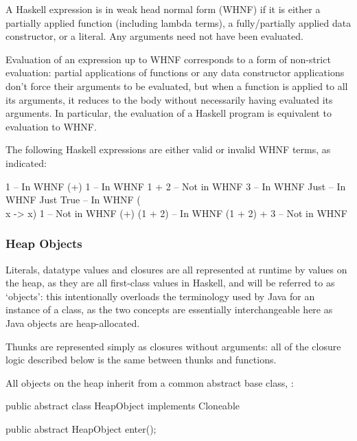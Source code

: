 \documentclass[dissertation.tex]{subfiles}
\begin{document}
{{{            A Haskell expression is in weak head normal form (WHNF) if it is either a partially applied function
            (including lambda terms), a fully/partially applied data constructor, or a literal. Any arguments need not
            have been evaluated.
            
            Evaluation of an expression up to WHNF corresponds to a form of non-strict evaluation: partial applications
            of functions or any data constructor applications don't force their arguments to be evaluated, but when a
            function is applied to all its arguments, it reduces to the body without necessarily having evaluated its
            arguments. In particular, the evaluation of a Haskell program is equivalent to evaluation to WHNF.

            The following Haskell expressions are either valid or invalid WHNF terms, as indicated:

            \begin{haskellfigure}
            1               -- In WHNF
            (+) 1           -- In WHNF
            1 + 2           -- Not in WHNF
            3               -- In WHNF
            Just            -- In WHNF
            Just True       -- In WHNF
            (\\x -> x) 1    -- Not in WHNF
            (+) (1 + 2)     -- In WHNF
            (1 + 2) + 3     -- Not in WHNF
            \end{haskellfigure}
        }
        \subsubsection{Heap Objects}
        {

            Literals, datatype values and closures are all represented at runtime by values on the heap, as they are all
            first-class values in Haskell, and will be referred to as `objects': this intentionally overloads the
            terminology used by Java for an instance of a class, as the two concepts are essentially interchangeable
            here as Java objects are heap-allocated.

            Thunks are represented simply as closures without arguments: all of the closure logic described below is the
            same between thunks and functions.

            All objects on the heap inherit from a common abstract base class, :

            \begin{javafigure}
            public abstract class HeapObject implements Cloneable {
                public abstract HeapObject enter();

}
\end{javafigure}}}}
\end{document}
